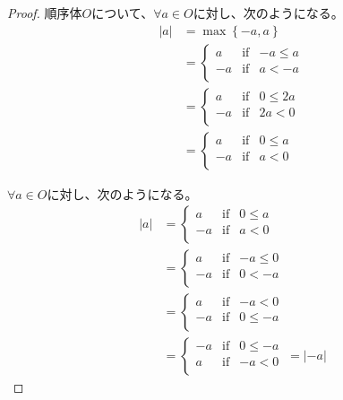 \documentclass[dvipdfmx]{jsarticle}
\begin{document}
\begin{proof} 順序体$O$について、$\forall a \in O$に対し、次のようになる。
\begin{align*}
|a| &= \max\left\{ - a,a \right\}\\ 
&= \left\{ \begin{matrix}
a & \mathrm{if} & - a \leq a \\
 - a & \mathrm{if} & a < - a \\
\end{matrix} \right.\ \\ 
&= \left\{ \begin{matrix}
a & \mathrm{if} & 0 \leq 2a \\
 - a & \mathrm{if} & 2a < 0 \\
\end{matrix} \right.\ \\ 
&= \left\{ \begin{matrix}
a & \mathrm{if} & 0 \leq a \\
 - a & \mathrm{if} & a < 0 \\
\end{matrix} \right.\ 
\end{align*}\par
$\forall a \in O$に対し、次のようになる。
\begin{align*}
|a| &= \left\{ \begin{matrix}
a & \mathrm{if} & 0 \leq a \\
 - a & \mathrm{if} & a < 0 \\
\end{matrix} \right.\ \\ 
&= \left\{ \begin{matrix}
a & \mathrm{if} & - a \leq 0 \\
 - a & \mathrm{if} & 0 < - a \\
\end{matrix} \right.\ \\ 
&= \left\{ \begin{matrix}
a & \mathrm{if} & - a < 0 \\
 - a & \mathrm{if} & 0 \leq - a \\
\end{matrix} \right.\ \\ 
&= \left\{ \begin{matrix}
 - a & \mathrm{if} & 0 \leq - a \\
a & \mathrm{if} & - a < 0 \\
\end{matrix} \right.\  = | - a|
\end{align*}\par

\end{proof}
\end{document}
